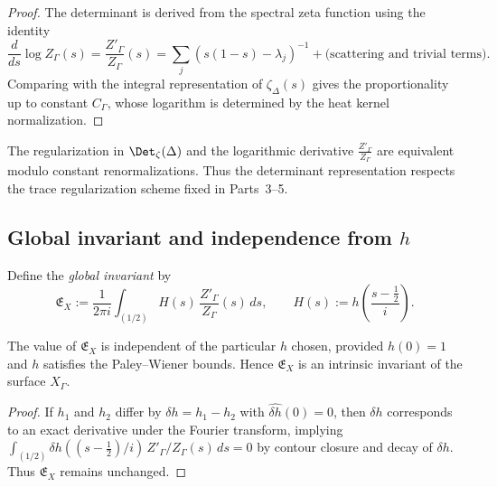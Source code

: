 \begin{proof}\relax
The determinant is derived from the spectral zeta function using the identity
\[
\frac{d}{ds}\log Z_\Gamma(s)
= \frac{Z'_\Gamma}{Z_\Gamma}(s)
= \sum_j (s(1-s)-\lambda_j)^{-1}
+ \text{(scattering and trivial terms)}.
\]
Comparing with the integral representation of $\zeta_\Delta(s)$ gives the proportionality up to constant $C_\Gamma$, whose logarithm is determined by the heat kernel normalization. \relax
\end{proof}

\begin{invariant}
The regularization in $\Det_\zeta(\Delta)$ and the logarithmic derivative $\frac{Z'_\Gamma}{Z_\Gamma}$ are equivalent modulo constant renormalizations. Thus the determinant representation respects the trace regularization scheme fixed in Parts~3–5. \relax
\end{invariant}

\subsection{Global invariant and independence from $h$}
\label{subsec:ch4-part6-global-invariant} \relax

\begin{definition}
\label{def:global-invariant}
Define the \emph{global invariant} by
\[
\mathfrak{E}_X := \frac{1}{2\pi i}\int_{(1/2)} H(s)\,
\frac{Z'_\Gamma}{Z_\Gamma}(s)\,ds,
\qquad H(s):=h\!\left(\frac{s-\tfrac12}{i}\right).
\]
\end{definition}

\begin{theorem}
\label{thm:Ex-independence}
The value of $\mathfrak{E}_X$ is independent of the particular $h$ chosen, provided $h(0)=1$ and $h$ satisfies the Paley–Wiener bounds. Hence $\mathfrak{E}_X$ is an intrinsic invariant of the surface $X_\Gamma$. \relax
\end{theorem}

\begin{proof}\relax
If $h_1$ and $h_2$ differ by $\delta h=h_1-h_2$ with $\widehat{\delta h}(0)=0$, then $\delta h$ corresponds to an exact derivative under the Fourier transform, implying $\int_{(1/2)} \delta h((s-\tfrac12)/i)\,Z'_\Gamma/Z_\Gamma(s)\,ds=0$ by contour closure and decay of $\delta h$. Thus $\mathfrak{E}_X$ remains unchanged. \relax
\end{proof}

